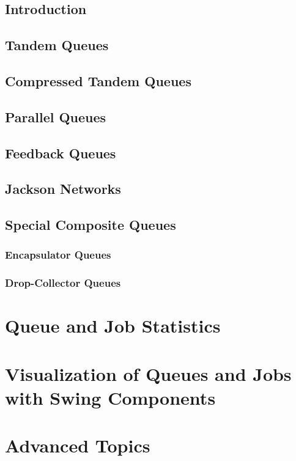 \documentclass[12pt]{book}
\begin{document}
\section{Introduction}

\section{Tandem Queues}

\section{Compressed Tandem Queues}

\section{Parallel Queues}

\section{Feedback Queues}

\section{Jackson Networks}

\section{Special Composite Queues}

\subsection{Encapsulator Queues}

\subsection{Drop-Collector Queues}

\chapter{Queue and Job Statistics}

\chapter{Visualization of Queues and Jobs with Swing Components}

\chapter{Advanced Topics}
\end{document}
